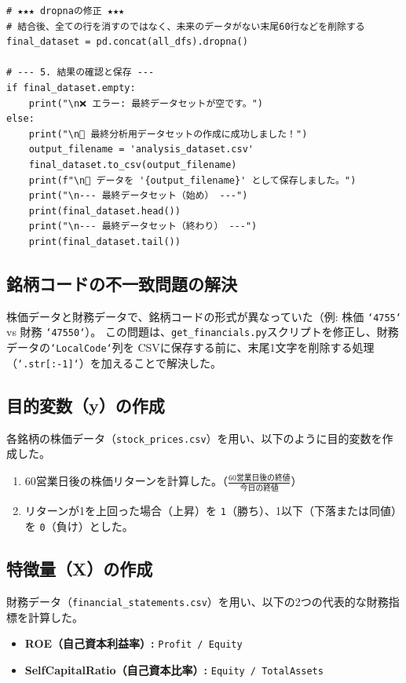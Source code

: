 \documentclass[a4paper, 11pt]{ltjsarticle}
\begin{document}
\begin{verbatim}
# ★★★ dropnaの修正 ★★★
# 結合後、全ての行を消すのではなく、未来のデータがない末尾60行などを削除する
final_dataset = pd.concat(all_dfs).dropna()

# --- 5. 結果の確認と保存 ---
if final_dataset.empty:
    print("\n❌ エラー: 最終データセットが空です。")
else:
    print("\n🎉 最終分析用データセットの作成に成功しました！")
    output_filename = 'analysis_dataset.csv'
    final_dataset.to_csv(output_filename)
    print(f"\n📄 データを '{output_filename}' として保存しました。")
    print("\n--- 最終データセット（始め） ---")
    print(final_dataset.head())
    print("\n--- 最終データセット（終わり） ---")
    print(final_dataset.tail())
\end{verbatim}


\subsection*{銘柄コードの不一致問題の解決}
株価データと財務データで、銘柄コードの形式が異なっていた（例: 株価 \texttt{`4755`} vs 財務 \texttt{`47550`}）。
この問題は、\texttt{get\_financials.py}スクリプトを修正し、財務データの\texttt{`LocalCode`}列を
CSVに保存する前に、末尾1文字を削除する処理（\texttt{`.str[:-1]`}）を加えることで解決した。

\subsection*{目的変数（y）の作成}
各銘柄の株価データ（\texttt{stock\_prices.csv}）を用い、以下のように目的変数を作成した。
\begin{enumerate}
  \item 60営業日後の株価リターンを計算した。（$\frac{\text{60営業日後の終値}}{\text{今日の終値}}$）
  \item リターンが1を上回った場合（上昇）を \texttt{1}（勝ち）、1以下（下落または同値）を \texttt{0}（負け）とした。
\end{enumerate}

\subsection*{特徴量（X）の作成}
財務データ（\texttt{financial\_statements.csv}）を用い、以下の2つの代表的な財務指標を計算した。
\begin{itemize}
  \item \textbf{ROE（自己資本利益率）:} \texttt{Profit / Equity}
  \item \textbf{SelfCapitalRatio（自己資本比率）:} \texttt{Equity / TotalAssets}
\end{itemize}
\end{document}
